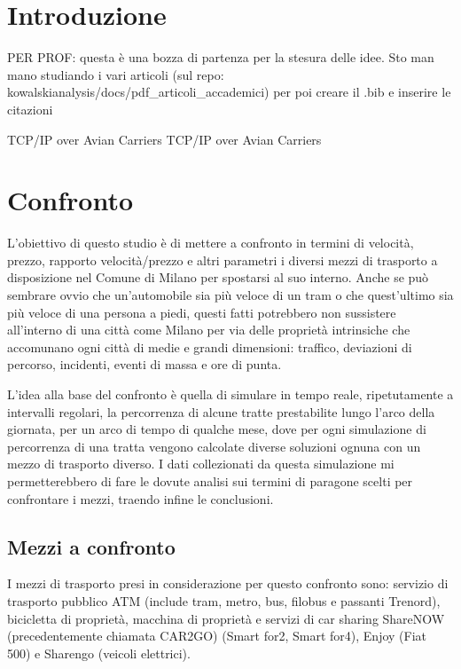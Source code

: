 \documentclass[a4paper]{report}
\begin{document}
	\tableofcontents
	
	\chapter{Introduzione}
	{\LARGE
		PER PROF: questa è una bozza di partenza per la stesura delle idee. Sto man mano studiando i vari articoli (sul repo: kowalskianalysis/docs/pdf\_articoli\_accademici) per poi creare il .bib e inserire le citazioni
	}


	TCP/IP over Avian Carriers\cite{waitzman1990standard}
	TCP/IP over Avian Carriers\cite{waitzman1990standard}
	
	\chapter{Confronto}
	{\large
		L'obiettivo di questo studio è di mettere a confronto in termini di velocità, prezzo, rapporto velocità/prezzo e altri parametri i diversi mezzi di trasporto a disposizione nel Comune di Milano per spostarsi al suo interno. Anche se può sembrare ovvio che un'automobile sia più veloce di un tram o che quest'ultimo sia più veloce di una persona a piedi, questi fatti potrebbero non sussistere all'interno di una città come Milano per via delle proprietà intrinsiche che accomunano ogni città di medie e grandi dimensioni: traffico, deviazioni di percorso, incidenti, eventi di massa e ore di punta.
	}

	{\large
		L'idea alla base del confronto è quella di simulare in tempo reale, ripetutamente a intervalli regolari, la percorrenza di alcune tratte prestabilite lungo l'arco della giornata, per un arco di tempo di qualche mese, dove per ogni simulazione di percorrenza di una tratta vengono calcolate diverse soluzioni ognuna con un mezzo di trasporto diverso. I dati collezionati da questa simulazione mi permetterebbero di fare le dovute analisi sui termini di paragone scelti per confrontare i mezzi, traendo infine le conclusioni.
	}

		\section{Mezzi a confronto}
		{\large
			I mezzi di trasporto presi in considerazione per questo confronto sono: servizio di trasporto pubblico ATM (include tram, metro, bus, filobus e passanti Trenord), bicicletta di proprietà, macchina di proprietà e servizi di car sharing ShareNOW (precedentemente chiamata CAR2GO) (Smart for2, Smart for4), Enjoy (Fiat 500) e Sharengo (veicoli elettrici).
		}
	
\end{document}
